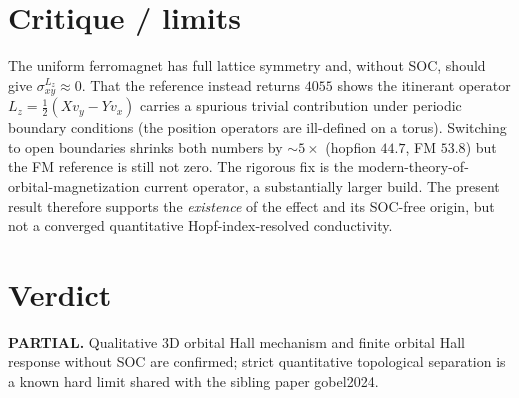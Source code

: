 \documentclass[11pt]{article}
\begin{document}
\section{Critique / limits}
The uniform ferromagnet has full lattice symmetry and, without SOC, should give
$\sigma^{L_z}_{xy}\approx0$. That the reference instead returns $4055$ shows the
itinerant operator $L_z=\tfrac12(Xv_y-Yv_x)$ carries a spurious trivial contribution
under periodic boundary conditions (the position operators are ill-defined on a torus).
Switching to open boundaries shrinks both numbers by $\sim5\times$ (hopfion $44.7$,
FM $53.8$) but the FM reference is still not zero. The rigorous fix is the
modern-theory-of-orbital-magnetization current operator, a substantially larger build.
The present result therefore supports the \emph{existence} of the effect and its
SOC-free origin, but not a converged quantitative Hopf-index-resolved conductivity.

\section{Verdict}
\textbf{PARTIAL.} Qualitative 3D orbital Hall mechanism and finite orbital Hall
response without SOC are confirmed; strict quantitative topological separation is a
known hard limit shared with the sibling paper gobel2024.
\end{document}
